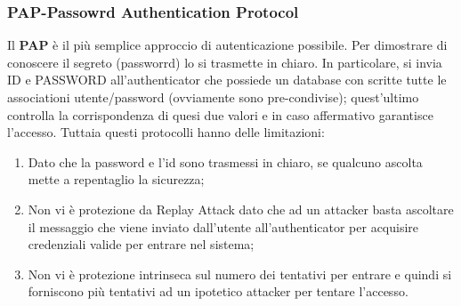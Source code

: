 \documentclass{article}
\theoremstyle{remark}
\begin{document}
\subsubsection{PAP-Passowrd Authentication Protocol}
Il \textbf{PAP} è il più semplice approccio di autenticazione possibile. Per dimostrare di conoscere il segreto (passworrd) lo si trasmette in chiaro. In particolare, si invia ID e PASSWORD all'authenticator che possiede un database con scritte tutte le associationi utente/password (ovviamente sono pre-condivise); quest'ultimo controlla la corrispondenza di quesi due valori e in caso affermativo garantisce l'accesso.\newline
Tuttaia questi protocolli hanno delle limitazioni:\begin{enumerate}
    \item Dato che la password e l'id sono trasmessi in chiaro, se qualcuno ascolta mette a repentaglio la sicurezza;
    \item Non vi è protezione da Replay Attack dato che ad un attacker basta ascoltare il messaggio che viene inviato dall'utente all'authenticator per acquisire credenziali valide  per entrare nel sistema;
    \item Non vi è protezione intrinseca sul numero dei tentativi per entrare e quindi si forniscono più tentativi ad un ipotetico attacker per tentare l'accesso.
\end{enumerate}
\end{document}
